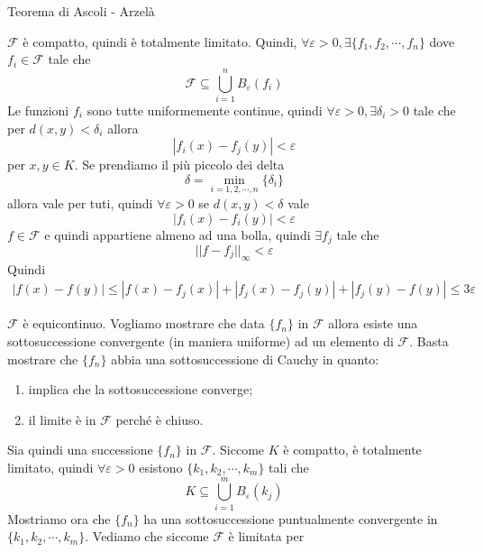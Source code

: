 \documentclass[a4paper]{article}
\begin{document}
\begin{snippetproof}{Teorema di Ascoli - Arzelà}
    \begin{iffproof}
        \item \(\mathcal{F}\) è compatto, quindi è totalmente limitato.
        Quindi, \(\forall \varepsilon > 0, \exists \{f_1, f_2, \cdots, f_n\}\)
        dove \(f_i \in \mathcal{F}\) tale che
        \[
            \mathcal{F} \subseteq \bigcup_{i=1}^n B_\varepsilon(f_i)
        \]
        Le funzioni \(f_i\) sono tutte uniformemente continue, quindi \(\forall \varepsilon > 0, \exists \delta_i > 0\)
        tale che per \(d(x,y) < \delta_i\) allora
        \[
            |f_i (x) - f_j(y)| < \varepsilon
        \]
        per \(x,y \in K\). Se prendiamo il più piccolo dei delta
        \[
            \delta = \min_{i=1,2,\cdots, n}\{\delta_i\}
        \]
        allora vale per tuti, quindi \(\forall \varepsilon>0\) se \(d(x,y) < \delta\)
        vale
        \[
            |f_i(x) - f_i(y)| < \varepsilon
        \]
        \(f\in\mathcal{F}\) e quindi appartiene almeno ad una bolla, quindi
        \(\exists f_j\) tale che
        \[
            ||f-f_j||_\infty < \varepsilon
        \]
        Quindi
        \begin{align*}
            |f(x) - f(y)| \leq |f(x) - f_j(x)| + |f_j(x) - f_j(y)|
            + |f_j(y) - f(y)|
            \leq 3\varepsilon
        \end{align*}
        \item \(\mathcal{F}\) è equicontinuo. Vogliamo mostrare che
        data \(\{f_n\}\) in \(\mathcal{F}\) allora esiste una sottosuccessione convergente (in maniera uniforme)
        ad un elemento di \(\mathcal{F}\). Basta mostrare che \(\{f_n\}\) abbia una sottosuccessione
        di Cauchy in quanto:
        \begin{enumerate}
            \item implica che la sottosuccessione converge;
            \item il limite è in \(\mathcal{F}\) perché è chiuso.
        \end{enumerate}
        Sia quindi una successione \(\{f_n\}\) in \(\mathcal{F}\). Siccome \(K\) è compatto,
        è totalmente limitato, quindi \(\forall \varepsilon > 0\)
        esistono \(\{k_1, k_2, \cdots, k_m\}\) tali che
        \[
            K \subseteq \bigcup_{i=1}^m B_\varepsilon(k_j)
        \]
        Mostriamo ora che \(\{f_n\}\) ha una sottosuccessione puntualmente convergente
        in \(\{k_1, k_2, \cdots, k_m\}\). Vediamo che siccome \(\mathcal{F}\) è limitata per

\end{iffproof}
\end{snippetproof}
\end{document}
